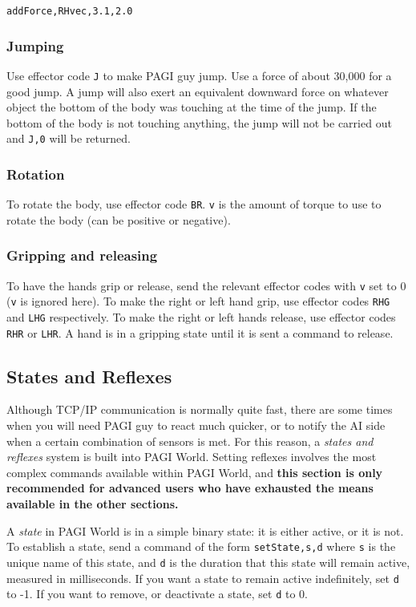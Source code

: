 \texttt{addForce,RHvec,3.1,2.0}

\subsubsection{Jumping}

Use effector code \texttt{J} to make PAGI guy jump. Use a force of about 30,000 for a good jump. A jump will also exert an equivalent downward force on whatever object the bottom of the body was touching at the time of the jump. If the bottom of the body is not touching anything, the jump will not be carried out and \texttt{J,0} will be returned.

\subsubsection{Rotation}

To rotate the body, use effector code \texttt{BR}. \texttt{v} is the amount of torque to use to rotate the body (can be positive or negative).

\subsubsection{Gripping and releasing}

To have the hands grip or release, send the relevant effector codes with \texttt{v} set to 0 (\texttt{v} is ignored here). To make the right or left hand grip, use effector codes \texttt{RHG} and \texttt{LHG} respectively. To make the right or left hands release, use effector codes \texttt{RHR} or \texttt{LHR}. A hand is in a gripping state until it is sent a command to release.

\subsection{States and Reflexes}
\label{sect:statesAndReflexes}

Although TCP/IP communication is normally quite fast, there are some times when you will need PAGI guy to react much quicker, or to notify the AI side when a certain combination of sensors is met. For this reason, a \textit{states and reflexes} system is built into PAGI World. Setting reflexes involves the most complex commands available within PAGI World, and \textbf{this section is only recommended for advanced users who have exhausted the means available in the other sections.}

A \textit{state} in PAGI World is in a simple binary state: it is either active, or it is not. To establish a state, send a command of the form \texttt{setState,s,d} where \texttt{s} is the unique name of this state, and \texttt{d} is the duration that this state will remain active, measured in milliseconds. If you want a state to remain active indefinitely, set \texttt{d} to -1. If you want to remove, or deactivate a state, set \texttt{d} to 0.

